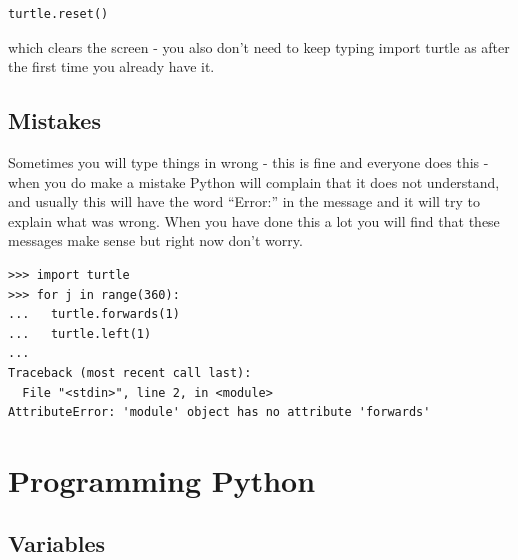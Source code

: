 \documentclass[a4paper, 11pt]{book}
\begin{document}
{\small
\begin{verbatim}
turtle.reset()
\end{verbatim}
}

\noindent
which clears the screen - you also don't need to keep typing import
turtle as after the first time you already have it.

\section{Mistakes}

Sometimes you will type things in wrong - this is fine and everyone does this - when you do make a mistake Python will complain that it does not understand, and usually this will have the word ``Error:'' in the message and it will try to explain what was wrong. When you have done this a lot you will find that these messages make sense but right now don't worry.

{\small
\begin{verbatim}
>>> import turtle
>>> for j in range(360):
...   turtle.forwards(1)
...   turtle.left(1)
... 
Traceback (most recent call last):
  File "<stdin>", line 2, in <module>
AttributeError: 'module' object has no attribute 'forwards'
\end{verbatim}
}

\chapter{Programming Python}

\section{Variables}
\end{document}
